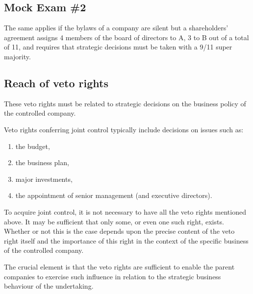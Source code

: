\newpage
    \subsection*{Mock Exam \#2}


        The same applies if the bylaws of a company are silent but a shareholders’ agreement assigns 4 members of the board of directors to A, 3 to B out of a total of 11, and requires that strategic decisions must be taken with a 9/11 super majority.

    \subsection{Reach of veto rights}

        These veto rights must be related to strategic decisions on the business policy of the controlled company.
        
        Veto rights conferring joint control typically include decisions on issues such as:
        \begin{enumerate}[label=\alph*.]
            \item the budget,
            \item the business plan,
            \item major investments,
            \item the appointment of senior management (and executive directors).
        \end{enumerate}
        
        To acquire joint control, it is not necessary to have all the veto rights mentioned above. It may be sufficient that only some, or even one such right, exists. Whether or not this is the case depends upon the precise content of the veto right itself and the importance of this right in the context of the specific business of the controlled company.
        
        The crucial element is that the veto rights are sufficient to enable the parent companies to exercise such influence in relation to the strategic business behaviour of the undertaking.
        
